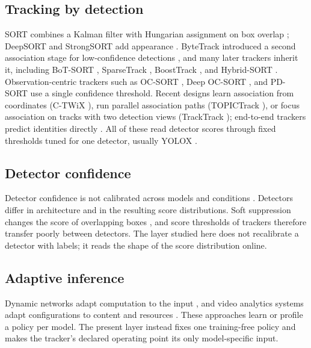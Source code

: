 \documentclass[journal]{new-aiaa}
\begin{document}
\subsection{Tracking by detection}
SORT combines a Kalman filter \cite{kalman1960} with Hungarian assignment \cite{kuhn1955hungarian} on box overlap \cite{bewley2016sort}; DeepSORT and StrongSORT add appearance \cite{wojke2017deepsort,du2023strongsort}. ByteTrack introduced a second association stage for low-confidence detections \cite{zhang2022bytetrack}, and many later trackers inherit it, including BoT-SORT \cite{aharon2022botsort}, SparseTrack \cite{liu2025sparsetrack}, BoostTrack \cite{stanojevic2024boosttrack}, and Hybrid-SORT \cite{yang2024hybridsort}. Observation-centric trackers such as OC-SORT \cite{cao2023ocsort}, Deep OC-SORT \cite{maggiolino2023deepocsort}, and PD-SORT \cite{wang2025pdsort} use a single confidence threshold. Recent designs learn association from coordinates (C-TWiX \cite{miah2025twix}), run parallel association paths (TOPICTrack \cite{cao2025topictrack}), or focus association on tracks with two detection views (TrackTrack \cite{shim2025tracktrack}); end-to-end trackers predict identities directly \cite{zeng2022motr,gao2025motip}. All of these read detector scores through fixed thresholds tuned for one detector, usually YOLOX \cite{ge2021yolox}.

\subsection{Detector confidence}
Detector confidence is not calibrated across models and conditions \cite{kuppers2020detcalib}. Detectors differ in architecture \cite{redmon2016yolo,ren2017fasterrcnn,carion2020detr,zhao2024rtdetr} and in the resulting score distributions. Soft suppression changes the score of overlapping boxes \cite{bodla2017softnms}, and score thresholds of trackers therefore transfer poorly between detectors. The layer studied here does not recalibrate a detector with labels; it reads the shape of the score distribution online.

\subsection{Adaptive inference}
Dynamic networks adapt computation to the input \cite{han2022dynamic}, and video analytics systems adapt configurations to content and resources \cite{jiang2018chameleon}. These approaches learn or profile a policy per model. The present layer instead fixes one training-free policy and makes the tracker's declared operating point its only model-specific input.
\end{document}
